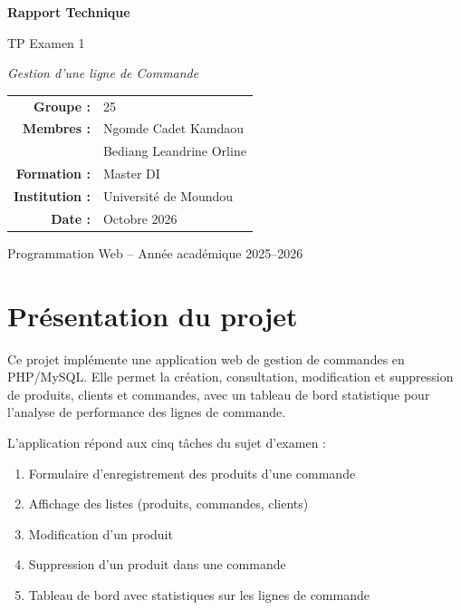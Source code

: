 \documentclass[11pt,a4paper]{article}
\begin{document}
\begin{titlepage}
\centering
\vspace*{3cm}
{\Huge\bfseries\color{bleu} Rapport Technique\par}
\vspace{0.5cm}
{\LARGE TP Examen 1\par}
\vspace{1cm}
{\Large\itshape Gestion d'une ligne de Commande\par}
\vspace{2cm}
{\large
\begin{tabular}{rl}
\textbf{Groupe :} & 25 \\
\textbf{Membres :} & Ngomde Cadet Kamdaou \\
                    & Bediang Leandrine Orline \\
\textbf{Formation :} & Master DI \\
\textbf{Institution :} & Universit\'e de Moundou \\
\textbf{Date :} & Octobre 2026 \\
\end{tabular}
\par}
\vfill
{\small Programmation Web -- Ann\'ee acad\'emique 2025--2026}
\end{titlepage}

\tableofcontents
\newpage


\section{Pr\'esentation du projet}

Ce projet impl\'emente une application web de gestion de commandes en PHP/MySQL.
Elle permet la cr\'eation, consultation, modification et suppression de produits,
clients et commandes, avec un tableau de bord statistique pour l'analyse de
performance des lignes de commande.

L'application r\'epond aux cinq t\^aches du sujet d'examen :
\begin{enumerate}
  \item Formulaire d'enregistrement des produits d'une commande
  \item Affichage des listes (produits, commandes, clients)
  \item Modification d'un produit
  \item Suppression d'un produit dans une commande
  \item Tableau de bord avec statistiques sur les lignes de commande
\end{enumerate}
\end{document}
